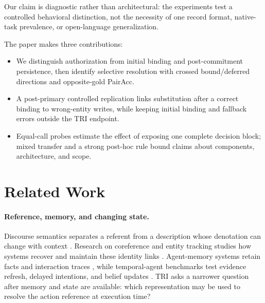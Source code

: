 \documentclass[letterpaper]{article}
\begin{document}
Our claim is diagnostic rather than architectural: the experiments test a controlled behavioral
distinction, not the necessity of one record format, native-task prevalence, or open-language
generalization.

The paper makes three contributions:
\nopagebreak[4]
\begin{itemize}
    \item We distinguish authorization from initial binding and post-commitment persistence, then
    identify selective resolution with crossed bound/deferred directions and opposite-gold PairAcc.
    \item A post-primary controlled replication links substitution after a correct binding to
    wrong-entity writes, while keeping initial binding and fallback errors outside the TRI endpoint.
    \item Equal-call probes estimate the effect of exposing one complete decision block; mixed
    transfer and a strong post-hoc rule bound claims about components, architecture, and scope.
\end{itemize}

\section{Related Work}

\paragraph{Reference, memory, and changing state.}
Discourse semantics separates a referent from a description whose denotation can change with
context \cite{kamp1993discourse,grosz1995centering}. Research on coreference and entity tracking studies
how systems recover and maintain these identity links
\cite{lee2017coreference,joshi2020spanbert,tang2026entitytracking}. Agent-memory systems retain facts
and interaction traces \cite{packer2023memgpt,sumers2024coala}, while temporal-agent benchmarks test
evidence refresh, delayed intentions, and belief updates
\cite{cheng2026temporalblindness,liu2026pmbench,ji2026clawarena,xu2026evoarena}. TRI asks a narrower
question after memory and state are available: which representation may be used to resolve the
action reference at execution time?
\end{document}
